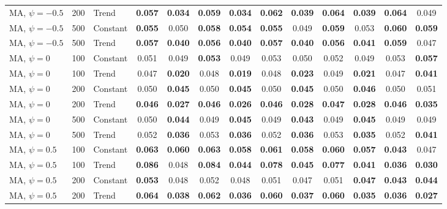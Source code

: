 \begin{tabular}{lrlcccccccccc}
MA, $\psi = -0.5$ & 200 & Trend & \textbf{0.057} & \textbf{0.034} & \textbf{0.059} & \textbf{0.034} & \textbf{0.062} & \textbf{0.039} & \textbf{0.064} & \textbf{0.039} & \textbf{0.064} & 0.049 \\
MA, $\psi = -0.5$ & 500 & Constant & \textbf{0.055} & 0.050 & \textbf{0.058} & \textbf{0.054} & \textbf{0.055} & 0.049 & \textbf{0.059} & 0.053 & \textbf{0.060} & \textbf{0.059} \\
MA, $\psi = -0.5$ & 500 & Trend & \textbf{0.057} & \textbf{0.040} & \textbf{0.056} & \textbf{0.040} & \textbf{0.057} & \textbf{0.040} & \textbf{0.056} & \textbf{0.041} & \textbf{0.059} & 0.047 \\
\addlinespace
MA, $\psi = 0$ & 100 & Constant & 0.051 & 0.049 & \textbf{0.053} & 0.049 & 0.053 & 0.050 & 0.052 & 0.049 & 0.053 & \textbf{0.057} \\
MA, $\psi = 0$ & 100 & Trend & 0.047 & \textbf{0.020} & 0.048 & \textbf{0.019} & 0.048 & \textbf{0.023} & 0.049 & \textbf{0.021} & 0.047 & \textbf{0.041} \\
MA, $\psi = 0$ & 200 & Constant & 0.050 & \textbf{0.045} & 0.050 & \textbf{0.045} & 0.050 & \textbf{0.045} & 0.050 & \textbf{0.046} & 0.050 & 0.051 \\
MA, $\psi = 0$ & 200 & Trend & \textbf{0.046} & \textbf{0.027} & \textbf{0.046} & \textbf{0.026} & \textbf{0.046} & \textbf{0.028} & \textbf{0.047} & \textbf{0.028} & \textbf{0.046} & \textbf{0.035} \\
MA, $\psi = 0$ & 500 & Constant & 0.050 & \textbf{0.044} & 0.049 & \textbf{0.045} & 0.049 & \textbf{0.043} & 0.049 & \textbf{0.045} & 0.049 & 0.049 \\
MA, $\psi = 0$ & 500 & Trend & 0.052 & \textbf{0.036} & 0.053 & \textbf{0.036} & 0.052 & \textbf{0.036} & 0.053 & \textbf{0.035} & 0.052 & \textbf{0.041} \\
\addlinespace
MA, $\psi = 0.5$ & 100 & Constant & \textbf{0.063} & \textbf{0.060} & \textbf{0.063} & \textbf{0.058} & \textbf{0.061} & \textbf{0.058} & \textbf{0.060} & \textbf{0.057} & \textbf{0.043} & 0.047 \\
MA, $\psi = 0.5$ & 100 & Trend & \textbf{0.086} & 0.048 & \textbf{0.084} & \textbf{0.044} & \textbf{0.078} & \textbf{0.045} & \textbf{0.077} & \textbf{0.041} & \textbf{0.036} & \textbf{0.030} \\
MA, $\psi = 0.5$ & 200 & Constant & \textbf{0.053} & 0.048 & 0.052 & 0.048 & 0.051 & 0.047 & 0.051 & \textbf{0.047} & \textbf{0.043} & \textbf{0.044} \\
MA, $\psi = 0.5$ & 200 & Trend & \textbf{0.064} & \textbf{0.038} & \textbf{0.062} & \textbf{0.036} & \textbf{0.060} & \textbf{0.037} & \textbf{0.060} & \textbf{0.035} & \textbf{0.036} & \textbf{0.027} \\

\end{tabular}
